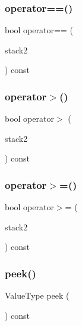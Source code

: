 \mbox{\label{classStack_ade246b6899202c53b8fd8fbe4930b09a}} 
\subsubsection{\texorpdfstring{operator==()}{operator==()}}
{\footnotesize\ttfamily bool operator== (\begin{DoxyParamCaption}\item[{const \mbox{\hyperlink{classStack}{Stack}}$<$ Value\+Type $>$ \&}]{stack2 }\end{DoxyParamCaption}) const}

\mbox{\label{classStack_a5031b32af5984055de8e2bdd4f7312c4}} 
\subsubsection{\texorpdfstring{operator$>$()}{operator>()}}
{\footnotesize\ttfamily bool operator$>$ (\begin{DoxyParamCaption}\item[{const \mbox{\hyperlink{classStack}{Stack}}$<$ Value\+Type $>$ \&}]{stack2 }\end{DoxyParamCaption}) const}

\mbox{\label{classStack_ad2ffb92607a0ad29b040677a695ccea8}} 
\subsubsection{\texorpdfstring{operator$>$=()}{operator>=()}}
{\footnotesize\ttfamily bool operator$>$= (\begin{DoxyParamCaption}\item[{const \mbox{\hyperlink{classStack}{Stack}}$<$ Value\+Type $>$ \&}]{stack2 }\end{DoxyParamCaption}) const}

\mbox{\label{classStack_a7fcf31135d35acfa8ab1174c44bf28f3}} 
\subsubsection{\texorpdfstring{peek()}{peek()}}
{\footnotesize\ttfamily Value\+Type peek (\begin{DoxyParamCaption}{ }\end{DoxyParamCaption}) const}

